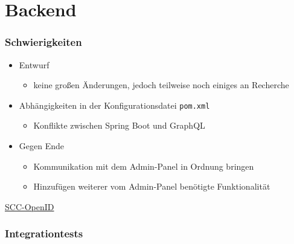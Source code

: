 \section{Backend}

\begin{frame}\frametitle{Schwierigkeiten}
\begin{itemize}
	\item Entwurf
	\begin{itemize}
		\item keine großen Änderungen, jedoch teilweise noch einiges an Recherche
	\end{itemize}
	\item Abhängigkeiten in der Konfigurationsdatei \texttt{pom.xml}
	\begin{itemize}
		\item Konflikte zwischen Spring Boot und GraphQL
	\end{itemize}
	\item Gegen Ende
	\begin{itemize}
		\item Kommunikation mit dem Admin-Panel in Ordnung bringen
		\item Hinzufügen weiterer vom Admin-Panel benötigte Funktionalität
	\end{itemize}
\end{itemize}
\end{frame}


    \begin{frame}%
        \href{https://www.scc.kit.edu/dienste/openid-connect.php}{SCC-OpenID}
    \end{frame}

    \begin{frame}\frametitle{Integrationtests}
    \end{frame}

    \begin{frame}%
    \end{frame}

    \begin{frame}
        \small
    \end{frame}

    \begin{frame}

    \end{frame}

